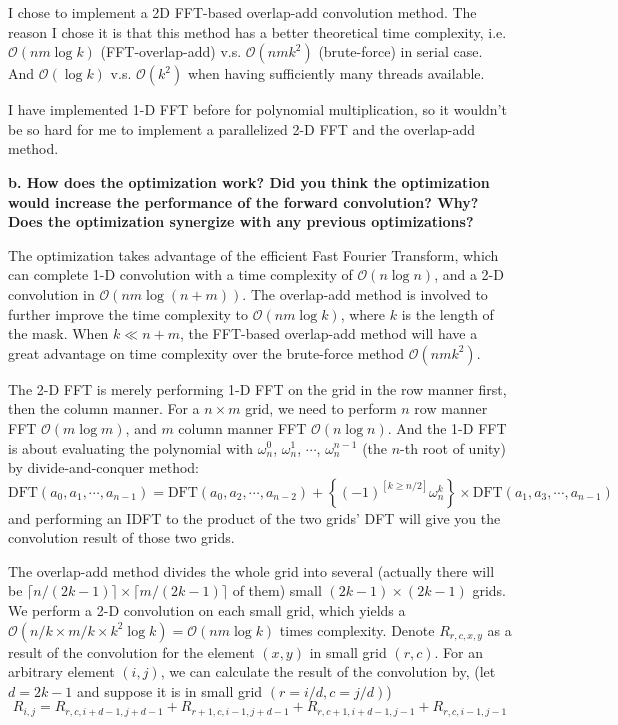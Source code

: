\documentclass[12pt]{article}
\begin{document}
I chose to implement a 2D FFT-based overlap-add convolution method. The reason I chose it is that this method has a better theoretical time complexity, i.e. $\mathcal O(nm \log k)$ (FFT-overlap-add) v.s. $\mathcal O(nm k^2)$ (brute-force) in serial case. And $\mathcal O(\log k)$ v.s. $\mathcal O(k^2)$ when having sufficiently many threads available.

I have implemented 1-D FFT before for polynomial multiplication, so it wouldn't be so hard for me to implement a parallelized 2-D FFT and the overlap-add method. 

\hfill \break
\noindent \textbf{b. \; How does the optimization work? Did you think the optimization would increase the performance of the forward convolution? Why? Does the optimization synergize with any previous optimizations?}
\hfill \break

The optimization takes advantage of the efficient Fast Fourier Transform, which can complete 1-D convolution with a time complexity of $\mathcal O(n \log n)$, and a 2-D convolution in $\mathcal O(nm \log (n + m))$. The overlap-add method is involved to further improve the time complexity to $\mathcal O(nm \log k)$, where $k$ is the length of the mask. When $k \ll n + m$, the FFT-based overlap-add method will have a great advantage on time complexity over the brute-force method $\mathcal O(nm k^2)$.

The 2-D FFT is merely performing 1-D FFT on the grid in the row manner first, then the column manner. For a $n \times m$ grid, we need to perform $n$ row manner FFT $\mathcal O(m \log m)$, and $m$ column manner FFT $\mathcal O(n \log n)$. And the 1-D FFT is about evaluating the polynomial with $\omega_{n}^0$, $\omega_{n}^1$, $\cdots$, $\omega_{n}^{n-1}$ (the $n$-th root of unity) by divide-and-conquer method:
$$ \mathrm{DFT}(a_0, a_1, \cdots, a_{n-1}) = \mathrm{DFT}(a_0, a_2, \cdots, a_{n-2}) + \left\{ (-1)^{[k \ge n / 2]} \omega_n^k \right\} \times \mathrm{DFT}(a_1, a_3, \cdots, a_{n-1}) $$
and performing an IDFT to the product of the two grids' DFT will give you the convolution result of those two grids.

The overlap-add method divides the whole grid into several (actually there will be $\lceil n / (2k - 1) \rceil \times \lceil m / (2k - 1) \rceil$ of them) small $(2k - 1) \times (2k - 1)$ grids. We perform a 2-D convolution on each small grid, which yields a $\mathcal O(n / k \times m / k \times k^2 \log k) = \mathcal O(nm \log k)$ times complexity. Denote $R_{r, c, x, y}$ as a result of the convolution for the element $(x, y)$ in small grid $(r, c)$. For an arbitrary element $(i, j)$, we can calculate the result of the convolution by, (let $d = 2k - 1$ and suppose it is in small grid $(r = i/d, c = j/d)$)
$$ R_{i, j} = R_{r, c, i + d - 1, j + d - 1} + R_{r + 1, c, i - 1, j + d - 1} + R_{r, c + 1, i + d - 1, j - 1} + R_{r, c, i - 1, j - 1} $$
\end{document}
